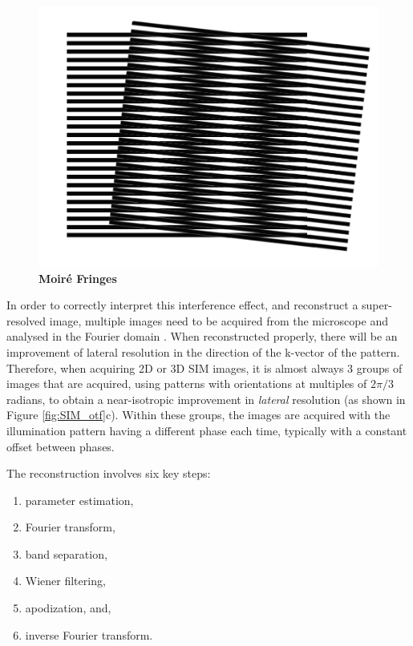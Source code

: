\documentclass[12pt]{article}
\begin{document}
\begin{figure}[hbtp]
    \includegraphics[scale=0.5, center]{figures/moire.png}
    \caption{\textbf{Moir\'{e} Fringes}}
    \label{fig:moire}
\end{figure}

In order to correctly interpret this interference effect, and reconstruct a super-resolved image,
multiple images need to be acquired from the microscope and analysed in the Fourier domain \cite{SIM2008}.
When reconstructed properly, there will be an improvement of lateral resolution in the direction of the k-vector of the pattern.
Therefore, when acquiring 2D or 3D SIM images, it is almost always 3 groups of images that are acquired,
using patterns with orientations at multiples of $2\pi/3$ radians,
to obtain a near-isotropic improvement in \textit{lateral} resolution (as shown in Figure \ref{fig:SIM_otf}c).
Within these groups, the images are acquired with the illumination pattern having a different phase each time,
typically with a constant offset between phases.

The reconstruction involves six key steps:

\begin{enumerate}
    \item parameter estimation,
    \item Fourier transform,
    \item band separation,
    \item Wiener filtering,
    \item apodization, and,
    \item inverse Fourier transform.
\end{enumerate}
\end{document}

